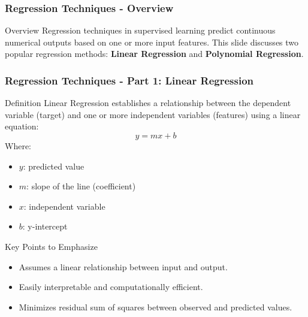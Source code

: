 \documentclass[aspectratio=169]{beamer}
\begin{document}
\begin{frame}[fragile]
    \frametitle{Regression Techniques - Overview}
    \begin{block}{Overview}
        Regression techniques in supervised learning predict continuous numerical outputs based on one or more input features. This slide discusses two popular regression methods: 
        \textbf{Linear Regression} and \textbf{Polynomial Regression}.
    \end{block}
\end{frame}

\begin{frame}[fragile]
    \frametitle{Regression Techniques - Part 1: Linear Regression}
    \begin{block}{Definition}
        Linear Regression establishes a relationship between the dependent variable (target) and one or more independent variables (features) using a linear equation:
        \begin{equation}
            y = mx + b
        \end{equation}
        Where:
        \begin{itemize}
            \item \(y\): predicted value
            \item \(m\): slope of the line (coefficient)
            \item \(x\): independent variable
            \item \(b\): y-intercept
        \end{itemize}
    \end{block}

    \begin{block}{Key Points to Emphasize}
        \begin{itemize}
            \item Assumes a linear relationship between input and output.
            \item Easily interpretable and computationally efficient.
            \item Minimizes residual sum of squares between observed and predicted values.
        \end{itemize}
    \end{block}
\end{frame}
\end{document}
